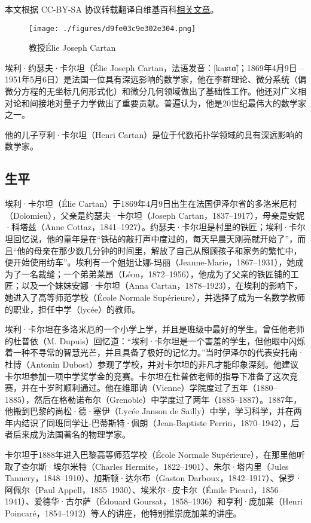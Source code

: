 
本文根据 CC-BY-SA 协议转载翻译自维基百科\href{https://en.wikipedia.org/wiki/\%C3\%89lie_Cartan}{相关文章}。

\begin{figure}[ht]
\centering
\texttt{[image: ./figures/d9fe03c9e302e304.png]}
\caption{教授Élie Joseph Cartan} \label{fig_Cartan_1}
\end{figure}
埃利·约瑟夫·卡尔坦（Élie Joseph Cartan，法语发音：[kaʁtɑ̃]；1869年4月9日 – 1951年5月6日）是法国一位具有深远影响的数学家，他在李群理论、微分系统（偏微分方程的无坐标几何形式化）和微分几何领域做出了基础性工作。他还对广义相对论和间接地对量子力学做出了重要贡献。普遍认为，他是20世纪最伟大的数学家之一。

他的儿子亨利·卡尔坦（Henri Cartan）是位于代数拓扑学领域的具有深远影响的数学家。
\subsection{生平}  
埃利·卡尔坦（Élie Cartan）于1869年4月9日出生在法国伊泽尔省的多洛米厄村（Dolomieu），父亲是约瑟夫·卡尔坦（Joseph Cartan，1837–1917），母亲是安妮·科塔兹（Anne Cottaz，1841–1927）。约瑟夫·卡尔坦是村里的铁匠；埃利·卡尔坦回忆说，他的童年是在“铁砧的敲打声中度过的，每天早晨天刚亮就开始了”，而且“他的母亲在那少数几分钟的时间里，解放了自己从照顾孩子和家务的繁忙中，便开始使用纺车”。埃利有一个姐姐让娜-玛丽（Jeanne-Marie，1867–1931），她成为了一名裁缝；一个弟弟莱昂（Léon，1872–1956），他成为了父亲的铁匠铺的工匠；以及一个妹妹安娜·卡尔坦（Anna Cartan，1878–1923），在埃利的影响下，她进入了高等师范学校（École Normale Supérieure），并选择了成为一名数学教师的职业，担任中学（lycée）的教师。

埃利·卡尔坦在多洛米厄的一个小学上学，并且是班级中最好的学生。曾任他老师的杜普依（M. Dupuis）回忆道：“埃利·卡尔坦是一个害羞的学生，但他眼中闪烁着一种不寻常的智慧光芒，并且具备了极好的记忆力。”当时伊泽尔的代表安托南·杜博（Antonin Dubost）参观了学校，并对卡尔坦的非凡才能印象深刻。他建议卡尔坦参加一项中学奖学金的竞赛。卡尔坦在杜普依老师的指导下准备了这次竞赛，并在十岁时顺利通过。他在维耶讷（Vienne）学院度过了五年（1880–1885），然后在格勒诺布尔（Grenoble）中学度过了两年（1885–1887）。1887年，他搬到巴黎的尚松·德·塞伊（Lycée Janson de Sailly）中学，学习科学，并在两年内结识了同班同学让-巴蒂斯特·佩朗（Jean-Baptiste Perrin，1870–1942），后者后来成为法国著名的物理学家。

卡尔坦于1888年进入巴黎高等师范学校（École Normale Supérieure），在那里他听取了查尔斯·埃尔米特（Charles Hermite，1822–1901）、朱尔·塔内里（Jules Tannery，1848–1910）、加斯顿·达尔布（Gaston Darboux，1842–1917）、保罗·阿佩尔（Paul Appell，1855–1930）、埃米尔·皮卡尔（Émile Picard，1856–1941）、爱德华·古尔萨（Édouard Goursat，1858–1936）和亨利·庞加莱（Henri Poincaré，1854–1912）等人的讲座，他特别推崇庞加莱的讲座。

